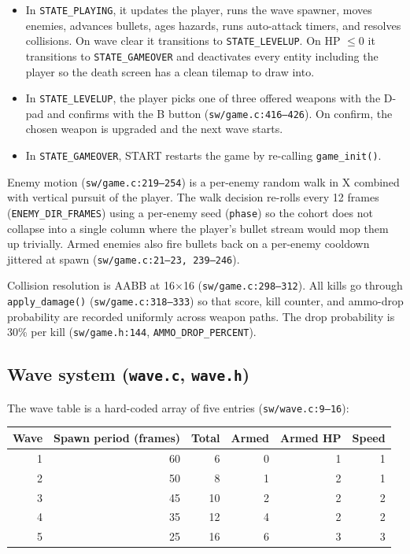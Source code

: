 \documentclass[11pt,letterpaper]{article}
\begin{document}
\begin{itemize}[leftmargin=*,nosep]
  \item In \texttt{STATE\_PLAYING}, it updates the player, runs the wave
    spawner, moves enemies, advances bullets, ages hazards, runs auto-attack
    timers, and resolves collisions. On wave clear it transitions to
    \texttt{STATE\_LEVELUP}. On HP $\leq 0$ it transitions to
    \texttt{STATE\_GAMEOVER} and deactivates every entity including the
    player so the death screen has a clean tilemap to draw into.
  \item In \texttt{STATE\_LEVELUP}, the player picks one of three offered
    weapons with the D-pad and confirms with the B button
    (\texttt{sw/game.c:416--426}). On confirm, the chosen weapon is upgraded
    and the next wave starts.
  \item In \texttt{STATE\_GAMEOVER}, START restarts the game by re-calling
    \texttt{game\_init()}.
\end{itemize}

Enemy motion (\texttt{sw/game.c:219--254}) is a per-enemy random walk in X
combined with vertical pursuit of the player. The walk decision re-rolls
every 12 frames (\texttt{ENEMY\_DIR\_FRAMES}) using a per-enemy seed
(\texttt{phase}) so the cohort does not collapse into a single column where
the player's bullet stream would mop them up trivially. Armed enemies also
fire bullets back on a per-enemy cooldown jittered at spawn
(\texttt{sw/game.c:21--23, 239--246}).

Collision resolution is AABB at 16$\times$16 (\texttt{sw/game.c:298--312}).
All kills go through \texttt{apply\_damage()} (\texttt{sw/game.c:318--333})
so that score, kill counter, and ammo-drop probability are recorded uniformly
across weapon paths. The drop probability is 30\% per kill
(\texttt{sw/game.h:144}, \texttt{AMMO\_DROP\_PERCENT}).

\subsection{Wave system (\texttt{wave.c}, \texttt{wave.h})}

The wave table is a hard-coded array of five entries (\texttt{sw/wave.c:9--16}):

\begin{table}[h]
\centering
\begin{tabular}{rrrrrr}
\toprule
Wave & Spawn period (frames) & Total & Armed & Armed HP & Speed \\
\midrule
1 & 60 & 6 & 0 & 1 & 1 \\
2 & 50 & 8 & 1 & 2 & 1 \\
3 & 45 & 10 & 2 & 2 & 2 \\
4 & 35 & 12 & 4 & 2 & 2 \\
5 & 25 & 16 & 6 & 3 & 3 \\
\bottomrule
\end{tabular}
\end{table}
\end{document}
